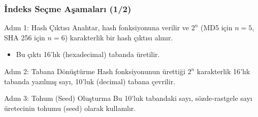 \documentclass[aspectratio=169,xcolor={dvipsnames}]{beamer}
\begin{document}
\begin{frame}
  \frametitle{İndeks Seçme Aşamaları (1/2)}
  
  \begin{block}{Adım 1: Hash Çıktısı}
    Anahtar, hash fonksiyonuna verilir ve $2^n$ (MD5 için $n=5$, SHA 256 için $n=6$) karakterlik bir hash çıktısı alınır.
    \begin{itemize}
      \item Bu çıktı 16'lık (hexadecimal) tabanda üretilir.
    \end{itemize}
  \end{block}
  
  \begin{block}{Adım 2: Tabana Dönüştürme}
    Hash fonksiyonunun ürettiği $2^n$ karakterlik 16'lık tabanda yazılmış sayı, 10'luk (decimal) tabana çevrilir.
  \end{block}
  
  \begin{block}{Adım 3: Tohum (Seed) Oluşturma}
    Bu 10'luk tabandaki sayı, sözde-rastgele sayı üretecinin tohumu (seed) olarak kullanılır.
  \end{block}
  
\end{frame}
\end{document}
